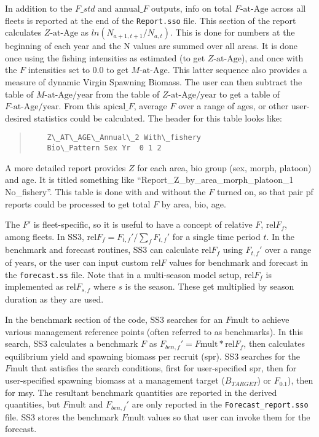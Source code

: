In addition to the $F\_std$ and $\text{annual\_}F$ outputs, info on total $F\text{-at-Age}$ across all fleets is reported at the end of the \texttt{Report.sso} file. This section of the report calculates $Z\text{-at-Age}$ as $ln(N_{a+1,t+1}/N_{a,t})$. This is done for numbers at the beginning of each year and the N values are summed over all areas. It is done once using the fishing intensities as estimated (to get $Z\text{-at-Age}$), and once with the $F$ intensities set to 0.0 to get $M\text{-at-Age}$. This latter sequence also provides a measure of dynamic Virgin Spawning Biomass. The user can then subtract the table of $M\text{-at-Age/year}$ from the table of $Z\text{-at-Age/year}$ to get a table of $F\text{-at-Age/year}$. From this $\text{apical\_}F$, average $F$ over a range of ages, or other user-desired statistics could be calculated. The header for this table looks like:
\begin{quote}
	\begin{verbatim}
	Z\_AT\_AGE\_Annual\_2 With\_fishery
	Bio\_Pattern Sex Yr  0 1 2
	\end{verbatim}
\end{quote}

A more detailed report provides $Z$ for each area, bio group (sex, morph, platoon) and age. It is titled something like ``Report\_Z\_by\_area\_morph\_platoon\_1 No\_fishery''. This table is done with and without the $F$ turned on, so that pair pf reports could be processed to get total $F$ by area, bio, age.

The $F'$ is fleet-specific, so it is useful to have a concept of relative $F$, $\text{rel}F_f$, among fleets. In SS3, $\text{rel}F_f= F_{t,f}'/\sum_{f}^{}F_{t,f}'$ for a single time period $t$. In the benchmark and forecast routines, SS3 can calculate $\text{rel}F_f$ using $F_{t,f}'$ over a range of years, or the user can input custom $\text{rel}F$ values for benchmark and forecast in the \texttt{forecast.ss} file. Note that in a multi-season model setup, $\text{rel}F_f$ is implemented as $\text{rel}F_{s,f}$ where $s$ is the season. These get multiplied by season duration as they are used.

In the benchmark section of the code, SS3 searches for an $F\text{mult}$ to achieve various management reference points (often referred to as benchmarks). In this search, SS3 calculates a benchmark $F$ as $F_{ben,f}' = F\text{mult} * \text{rel}F_f$, then calculates equilibrium yield and spawning biomass per recruit (\gls{spr}). SS3 searches for the $F\text{mult}$ that satisfies the search conditions, first for user-specified \gls{spr}, then for user-specified spawning biomass at a management target ($B_{TARGET}$) or $F_{0.1}$), then for \gls{msy}. The resultant benchmark quantities are reported in the derived quantities, but $F\text{mult}$ and $F_{ben,f}'$ are only reported in the \texttt{Forecast\_report.sso} file. SS3 stores the benchmark $F\text{mult}$ values so that user can invoke them for the forecast.

